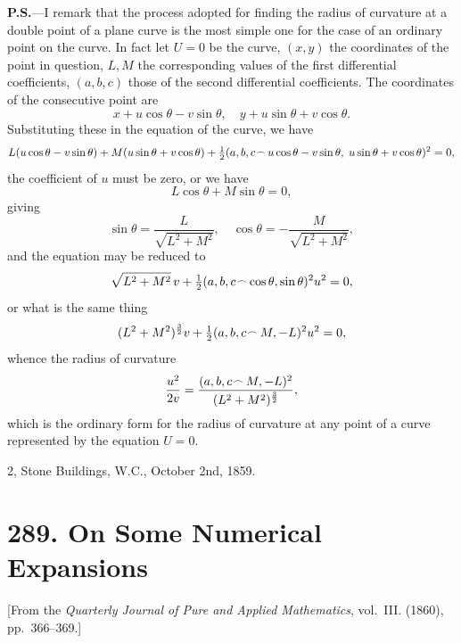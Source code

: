 \documentclass[11pt,a4paper]{book}
\begin{document}
\textbf{P.S.}---I remark that the process adopted for finding the radius of curvature at a double point of a plane curve is the most simple one for the case of an ordinary point on the curve. In fact let $U = 0$ be the curve, $(x, y)$ the coordinates of the point in question, $L, M$ the corresponding values of the first differential coefficients, $(a, b, c)$ those of the second differential coefficients. The coordinates of the consecutive point are
\[
x + u\cos\theta - v\sin\theta,\quad y + u\sin\theta + v\cos\theta.
\]
Substituting these in the equation of the curve, we have
\[
L(u\cos\theta - v\sin\theta) + M(u\sin\theta + v\cos\theta) + \tfrac{1}{2}(a, b, c \mathbin{\vcenter{\hbox{$\scriptstyle\!\frown$}}} u\cos\theta - v\sin\theta,\; u\sin\theta + v\cos\theta)^2 = 0,
\]
the coefficient of $u$ must be zero, or we have
\[
L\cos\theta + M\sin\theta = 0,
\]
giving
\[
\sin\theta = \frac{L}{\sqrt{L^2 + M^2}},\quad \cos\theta = -\frac{M}{\sqrt{L^2 + M^2}},
\]
and the equation may be reduced to
\[
\sqrt{L^2 + M^2}\,v + \tfrac{1}{2}(a, b, c \mathbin{\vcenter{\hbox{$\scriptstyle\!\frown$}}} \cos\theta, \sin\theta)^2 u^2 = 0,
\]
or what is the same thing
\[
(L^2 + M^2)^{\frac{3}{2}} v + \tfrac{1}{2}(a, b, c \mathbin{\vcenter{\hbox{$\scriptstyle\!\frown$}}} M, -L)^2 u^2 = 0,
\]
whence the radius of curvature
\[
\frac{u^2}{2v} = \frac{(a, b, c \mathbin{\vcenter{\hbox{$\scriptstyle\!\frown$}}} M, -L)^2}{(L^2 + M^2)^{\frac{3}{2}}},
\]
which is the ordinary form for the radius of curvature at any point of a curve represented by the equation $U = 0$.

\hfill 2, Stone Buildings, W.C., October 2nd, 1859.


\newpage
\section*{289. On Some Numerical Expansions}
\label{sec:289}

[From the \textit{Quarterly Journal of Pure and Applied Mathematics}, vol.~III. (1860), pp.~366--369.]
\end{document}
